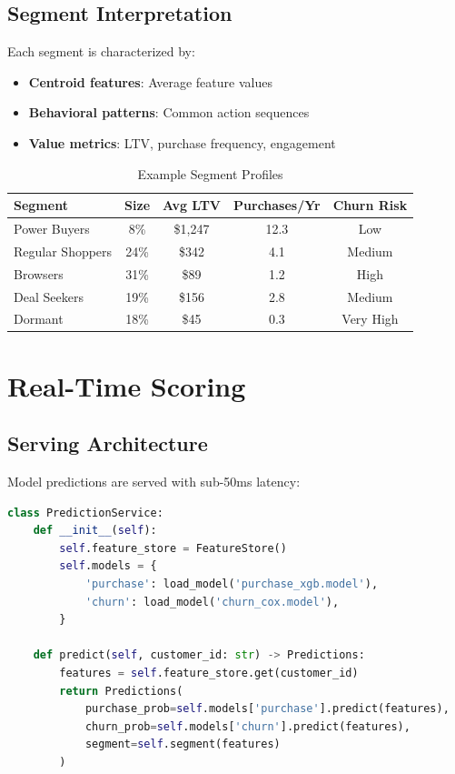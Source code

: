\documentclass[11pt,a4paper]{article}
\begin{document}
\subsection{Segment Interpretation}

Each segment is characterized by:

\begin{itemize}
    \item \textbf{Centroid features}: Average feature values
    \item \textbf{Behavioral patterns}: Common action sequences
    \item \textbf{Value metrics}: LTV, purchase frequency, engagement
\end{itemize}

\begin{table}[h]
\centering
\caption{Example Segment Profiles}
\begin{tabular}{lcccc}
\toprule
\textbf{Segment} & \textbf{Size} & \textbf{Avg LTV} & \textbf{Purchases/Yr} & \textbf{Churn Risk} \\
\midrule
Power Buyers & 8\% & \$1,247 & 12.3 & Low \\
Regular Shoppers & 24\% & \$342 & 4.1 & Medium \\
Browsers & 31\% & \$89 & 1.2 & High \\
Deal Seekers & 19\% & \$156 & 2.8 & Medium \\
Dormant & 18\% & \$45 & 0.3 & Very High \\
\bottomrule
\end{tabular}
\end{table}

\section{Real-Time Scoring}

\subsection{Serving Architecture}

Model predictions are served with sub-50ms latency:

\begin{lstlisting}[language=Python, caption=Prediction Service]
class PredictionService:
    def __init__(self):
        self.feature_store = FeatureStore()
        self.models = {
            'purchase': load_model('purchase_xgb.model'),
            'churn': load_model('churn_cox.model'),
        }

    def predict(self, customer_id: str) -> Predictions:
        features = self.feature_store.get(customer_id)
        return Predictions(
            purchase_prob=self.models['purchase'].predict(features),
            churn_prob=self.models['churn'].predict(features),
            segment=self.segment(features)
        )
\end{lstlisting}
\end{document}
